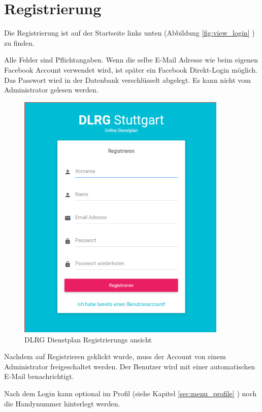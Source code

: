 \chapter{Registrierung}
\label{cha:register}

Die Registrierung ist auf der Startseite links unten (Abbildung  \ref{fig:view_login} \textit{}) zu finden.

\vspace*{5mm} \noindent Alle Felder sind Pflichtangaben. Wenn die selbe E-Mail Adresse wie beim eigenen Facebook Account verwendet wird, ist später ein Facebook Direkt-Login möglich. Das Passwort wird in der Datenbank verschlüsselt abgelegt. Es kann nicht vom Administrator gelesen werden.

\begin{figure}[h]
 \begin{addmargin}{-0.2\linewidth}
   \centering 
   \includegraphics[width=10cm]{Bilder/view_register.png}
 \end{addmargin} 
 \caption[Registrierungs ansicht]{DLRG Dienstplan Registrierungs ansicht}
 \label{fig:view_register}
\end{figure}

\vspace*{5mm} \noindent 
Nachdem auf Registrieren geklickt wurde, muss der Account von einem Administrator freigeschaltet werden. Der Benutzer wird mit einer automatischen E-Mail benachrichtigt. 

\noindent Nach dem Login kann optional im Profil (siehe Kapitel \ref{sec:menu_profile} \textit{}) noch die Handynummer hinterlegt werden.